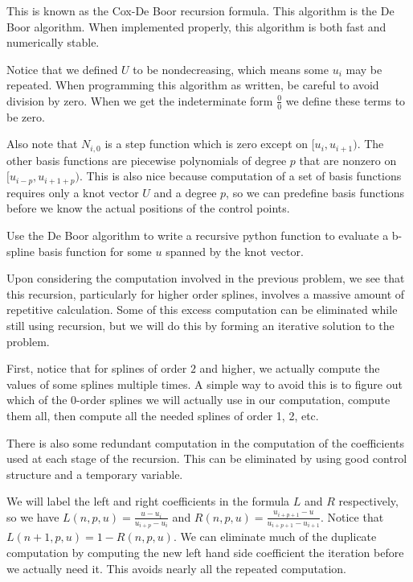 This is known as the Cox-De Boor recursion formula.
This algorithm is the De Boor algorithm. 
When implemented properly, this algorithm is both fast and numerically stable.

Notice that we defined $U$ to be nondecreasing, which means some $u_i$ may be repeated.
When programming this algorithm as written, be careful to avoid division by zero.
When we get the indeterminate form $\frac{0}{0}$ we define these terms to be zero.

Also note that $N_{i,0}$ is a step function which is zero except on $[u_i, u_{i+1})$. 
The other basis functions are piecewise polynomials of degree $p$ that are nonzero on $[u_{i-p}, u_{i+1+p})$.
This is also nice because computation of a set of basis functions requires only a knot vector $U$ and a degree $p$, so we can predefine basis functions before we know the actual positions of the control points.

\begin{problem}
Use the De Boor algorithm to write a recursive python function to evaluate a b-spline basis function for some $u$ spanned by the knot vector.
\end{problem}

Upon considering the computation involved in the previous problem, we see that this recursion, particularly for higher order splines, involves a massive amount of repetitive calculation.
Some of this excess computation can be eliminated while still using recursion, but we will do this by forming an iterative solution to the problem.

First, notice that for splines of order $2$ and higher, we actually compute the values of some splines multiple times.
A simple way to avoid this is to figure out which of the 0-order splines we will actually use in our computation, compute them all, then compute all the needed splines of order 1, 2, etc.

There is also some redundant computation in the computation of the coefficients used at each stage of the recursion.
This can be eliminated by using good control structure and a temporary variable.

We will label the left and right coefficients in the formula $L$ and $R$ respectively, so we have $L(n,p,u) = \frac{u - u_i}{u_{i+p} - u_i}$ and $R(n,p,u) = \frac{u_{i + p + 1} - u}{u_{i + p + 1} - u_{i + 1}}$. Notice that $L(n+1,p,u) = 1 - R(n,p,u)$. We can eliminate much of the duplicate computation by computing the new left hand side coefficient the iteration before we actually need it. This avoids nearly all the repeated computation.

